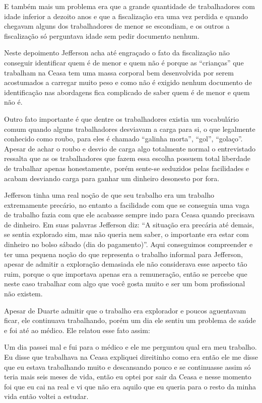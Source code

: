 \begin{citacao}
E também mais um problema era que a grande quantidade de trabalhadores com idade inferior a dezoito anos e que a fiscalização era uma vez perdida e quando chegavam alguns dos trabalhadores de menor se escondiam, e os outros a fiscalização só perguntava idade sem pedir documento nenhum.
\end{citacao}

Neste depoimento Jefferson acha até engraçado o fato da fiscalização não conseguir identificar quem é de menor e quem não é porque as ``crianças'' que trabalham na Ceasa tem uma massa corporal bem desenvolvida por serem acostumados a carregar muito peso e como não é exigido nenhum documento de identificação nas abordagens fica complicado de saber quem é de menor e quem não é.

Outro fato importante é que dentre os trabalhadores existia um vocabulário comum quando alguns trabalhadores desviavam a carga para si, o que legalmente conhecido como roubo, para eles é chamado ``galinha morta'', ``gol'', ``golaço''. Apesar de achar o roubo e desvio de carga algo totalmente normal o entrevistado ressalta que as os trabalhadores que fazem essa escolha possuem total liberdade de trabalhar apenas honestamente, porém sente-se seduzidos pelas facilidades e acabam desviando carga para ganhar um dinheiro desonesto por fora.

Jefferson tinha uma real noção de que seu trabalho era um trabalho extremamente precário, no entanto a facilidade com que se conseguia uma vaga de trabalho fazia com que ele acabasse sempre indo para Ceasa quando precisava de dinheiro. Em suas palavras Jefferson diz: ``A situação era precária até demais, se sentia explorado sim, mas não queria nem saber, o importante era estar com dinheiro no bolso sábado (dia do pagamento)''. Aqui conseguimos compreender e ter uma pequena noção do que representa o trabalho informal para Jefferson, apesar de admitir a exploração demasiada ele não considerava esse aspecto tão ruim, porque o que importava apenas era a remuneração, então se percebe que neste caso trabalhar com algo que você gosta muito e ser um bom profissional não existem.

Apesar de Duarte admitir que o trabalho era explorador e poucos aguentavam ficar, ele continuava trabalhando, porém um dia ele sentiu um problema de saúde e foi até ao médico. Ele relatou esse fato assim:

\begin{citacao}
Um dia passei mal e fui para o médico e ele me perguntou qual era meu trabalho. Eu disse que trabalhava na Ceasa expliquei direitinho como era então ele me disse que eu estava trabalhando muito e descansando pouco e se continuasse assim só teria mais seis meses de vida, então eu optei por sair da Ceasa e nesse momento foi que eu cai na real e vi que não era aquilo que eu queria para o resto da minha vida então voltei a estudar. 
\end{citacao}

